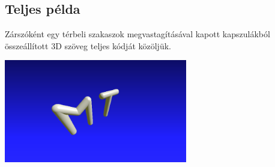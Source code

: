 \subsection{Teljes példa}

Zárszóként egy térbeli szakaszok megvastagításával kapott kapszulákból
összeállított 3D szöveg teljes kódját közöljük.


\begin{center}
  \includegraphics[width=8cm]{images/final.png}
  \end{center}





